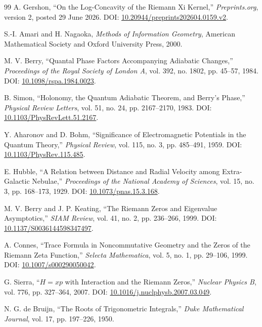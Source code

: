 \begin{thebibliography}{99}
A. Gershon,
``On the Log-Concavity of the Riemann Xi Kernel,''
\emph{Preprints.org}, version 2, posted 29 June 2026.
DOI: \href{https://doi.org/10.20944/preprints202604.0159.v2}{10.20944/preprints202604.0159.v2}.

S.-I. Amari and H. Nagaoka,
\emph{Methods of Information Geometry},
American Mathematical Society and Oxford University Press, 2000.

M. V. Berry,
``Quantal Phase Factors Accompanying Adiabatic Changes,''
\emph{Proceedings of the Royal Society of London A}, vol. 392, no. 1802, pp. 45--57, 1984.
DOI: \href{https://doi.org/10.1098/rspa.1984.0023}{10.1098/rspa.1984.0023}.

B. Simon,
``Holonomy, the Quantum Adiabatic Theorem, and Berry's Phase,''
\emph{Physical Review Letters}, vol. 51, no. 24, pp. 2167--2170, 1983.
DOI: \href{https://doi.org/10.1103/PhysRevLett.51.2167}{10.1103/PhysRevLett.51.2167}.

Y. Aharonov and D. Bohm,
``Significance of Electromagnetic Potentials in the Quantum Theory,''
\emph{Physical Review}, vol. 115, no. 3, pp. 485--491, 1959.
DOI: \href{https://doi.org/10.1103/PhysRev.115.485}{10.1103/PhysRev.115.485}.

E. Hubble,
``A Relation between Distance and Radial Velocity among Extra-Galactic Nebulae,''
\emph{Proceedings of the National Academy of Sciences}, vol. 15, no. 3, pp. 168--173, 1929.
DOI: \href{https://doi.org/10.1073/pnas.15.3.168}{10.1073/pnas.15.3.168}.

M. V. Berry and J. P. Keating,
``The Riemann Zeros and Eigenvalue Asymptotics,''
\emph{SIAM Review}, vol. 41, no. 2, pp. 236--266, 1999.
DOI: \href{https://doi.org/10.1137/S0036144598347497}{10.1137/S0036144598347497}.

A. Connes,
``Trace Formula in Noncommutative Geometry and the Zeros of the Riemann Zeta Function,''
\emph{Selecta Mathematica}, vol. 5, no. 1, pp. 29--106, 1999.
DOI: \href{https://doi.org/10.1007/s000290050042}{10.1007/s000290050042}.

G. Sierra,
``$H=xp$ with Interaction and the Riemann Zeros,''
\emph{Nuclear Physics B}, vol. 776, pp. 327--364, 2007.
DOI: \href{https://doi.org/10.1016/j.nuclphysb.2007.03.049}{10.1016/j.nuclphysb.2007.03.049}.

N. G. de Bruijn,
``The Roots of Trigonometric Integrals,''
\emph{Duke Mathematical Journal}, vol. 17, pp. 197--226, 1950.


\end{thebibliography}
